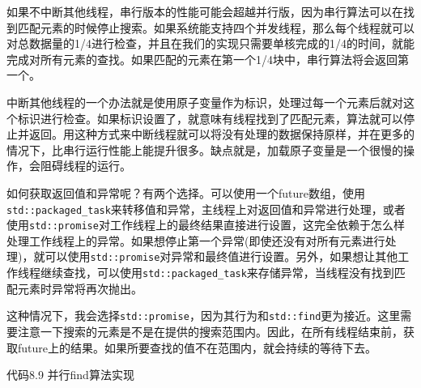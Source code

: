 如果不中断其他线程，串行版本的性能可能会超越并行版，因为串行算法可以在找到匹配元素的时候停止搜索。如果系统能支持四个并发线程，那么每个线程就可以对总数据量的1/4进行检查，并且在我们的实现只需要单核完成的1/4的时间，就能完成对所有元素的查找。如果匹配的元素在第一个1/4块中，串行算法将会返回第一个。

中断其他线程的一个办法就是使用原子变量作为标识，处理过每一个元素后就对这个标识进行检查。如果标识设置了，就意味有线程找到了匹配元素，算法就可以停止并返回。用这种方式来中断线程就可以将没有处理的数据保持原样，并在更多的情况下，比串行运行性能上能提升很多。缺点就是，加载原子变量是一个很慢的操作，会阻碍线程的运行。

如何获取返回值和异常呢？有两个选择。可以使用一个future数组，使用\texttt{std::packaged\_task}来转移值和异常，主线程上对返回值和异常进行处理，或者使用\texttt{std::promise}对工作线程上的最终结果直接进行设置，这完全依赖于怎么样处理工作线程上的异常。如果想停止第一个异常(即使还没有对所有元素进行处理)，就可以使用\texttt{std::promise}对异常和最终值进行设置。另外，如果想让其他工作线程继续查找，可以使用\texttt{std::packaged\_task}来存储异常，当线程没有找到匹配元素时异常将再次抛出。

这种情况下，我会选择\texttt{std::promise}，因为其行为和\texttt{std::find}更为接近。这里需要注意一下搜索的元素是不是在提供的搜索范围内。因此，在所有线程结束前，获取future上的结果。如果所要查找的值不在范围内，就会持续的等待下去。

代码8.9 并行find算法实现

